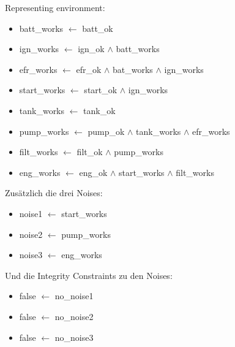 \documentclass[ngerman]{fbi-aufgabenblatt}
\begin{document}
Representing environment:
\begin{itemize}
\item batt\_works \(\leftarrow\) batt\_ok
\item ign\_works \(\leftarrow\) ign\_ok \(\land\) batt\_works
\item efr\_works \(\leftarrow\) efr\_ok \(\land\) bat\_works \(\land\) ign\_works
\item start\_works \(\leftarrow\) start\_ok \(\land\) ign\_works
\item tank\_works \(\leftarrow\) tank\_ok
\item pump\_works \(\leftarrow\) pump\_ok \(\land\) tank\_works \(\land\) efr\_works
\item filt\_works \(\leftarrow\) filt\_ok \(\land\) pump\_works
\item eng\_works \(\leftarrow\) eng\_ok \(\land\) start\_works \(\land\) filt\_works \\
\end{itemize}

Zusätzlich die drei Noises:
\begin{itemize}
\item noise1 \(\leftarrow\) start\_works
\item noise2 \(\leftarrow\) pump\_works
\item noise3 \(\leftarrow\) eng\_works \\
\end{itemize}

Und die Integrity Constraints zu den Noises:
\begin{itemize}
\item false \(\leftarrow\) no\_noise1 
\item false \(\leftarrow\) no\_noise2
\item false \(\leftarrow\) no\_noise3  \\
\end{itemize}
\end{document}

